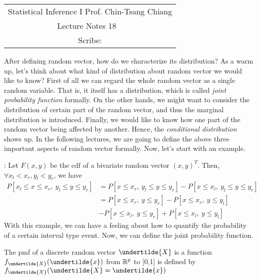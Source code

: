 \documentclass[../MultivariateProbabilityAndRelatedProperties.tex]{subfiles}
\begin{document}
	\begin{center}
		\renewcommand{\arraystretch}{2}
		\begin{bfseries}
			\begin{tabular}{|c|}
				\hline
				Statistical Inference I \hfill Prof. Chin-Tsang Chiang\\
				\hspace{15em} {\large Lecture Notes 18} \hspace{15em}\ \\
				\lecdate \hfill Scribe: \scribe\\
				\hline
			\end{tabular}
			\renewcommand{\arraystretch}{1}
		\end{bfseries}
	\end{center}

After defining random vector, how do we characterize its distribution? As a warm up, let's think about what kind of distribution about random vector we would like to know? First of all we can regard the whole random vector as a single random variable. That is, it itself has a distribution, which is called {\it joint probability function} formally. On the other hands, we might want to consider the distribution of certain part of the random vector, and thus the marginal distribution is introduced. Finally, we would like to know how one part of the random vector being affected by another. Hence, the {\it conditional distribution} shows up. In the following lectures, we are going to define the above three important aspects of random vector formally. Now, let's start with an example.

: Let $F(x,y)$ be the cdf of a bivariate random vector $(x,y)^T$. Then, $\forall x_l<x_r,y_l<y_r$, we have
\begin{align*}
P[x_l\leq x\leq x_r,\ y_l\leq y\leq y_r] &= P[x\leq x_r,\ y_l\leq y\leq y_r] - P[x\leq x_l,\ y_l\leq y\leq y_r]\\
&= P[x\leq x_r,\ y\leq y_r] - P[x\leq x_r,\ y\leq y_l]\\
&-P[x\leq x_l,\ y\leq y_r] + P[x\leq x_l,\ y\leq y_l]
\end{align*}
With this example, we can have a feeling about how to quantify the probability of a certain interval type event. Now, we can define the joint probability function.
\begin{definition}
	The pmf of a discrete random vector $\undertilde{X}$ is a function $f_{\undertilde{X}}(\undertilde{x})$ from ${\mathbb R}^p$ to [0,1] is defined by $f_{\undertilde{X}}(\undertilde{X}=\undertilde{x})$
\end{definition}
\end{document}

